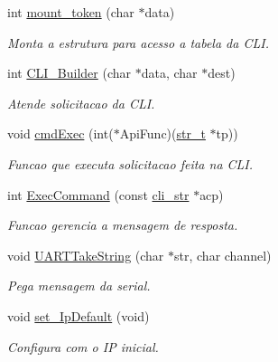 \begin{DoxyCompactItemize}
\item 
int \hyperlink{group__CLI_ga6fdb603107a7e72ff375cebbe2e98834}{mount\_\-token} (char $\ast$data)
\begin{DoxyCompactList}\small\item\em Monta a estrutura para acesso a tabela da CLI. \item\end{DoxyCompactList}\item 
int \hyperlink{group__CLI_ga51e54cd2d0893765bc23ac6d5d09d764}{CLI\_\-Builder} (char $\ast$data, char $\ast$dest)
\begin{DoxyCompactList}\small\item\em Atende solicitacao da CLI. \item\end{DoxyCompactList}\item 
void \hyperlink{group__CLI_ga5e8645941f27ac06c8c1840431b89693}{cmdExec} (int($\ast$ApiFunc)(\hyperlink{structstr__t}{str\_\-t} $\ast$tp))
\begin{DoxyCompactList}\small\item\em Funcao que executa solicitacao feita na CLI. \item\end{DoxyCompactList}\item 
int \hyperlink{group__CLI_ga8baf10611274f6c9d0470f2bb87cfde5}{ExecCommand} (const \hyperlink{structcli__str}{cli\_\-str} $\ast$acp)
\begin{DoxyCompactList}\small\item\em Funcao gerencia a mensagem de resposta. \item\end{DoxyCompactList}\item 
void \hyperlink{group__CLI_ga1429ebccb99aee0282eeff302630c26f}{UARTTakeString} (char $\ast$str, char channel)
\begin{DoxyCompactList}\small\item\em Pega mensagem da serial. \item\end{DoxyCompactList}\item 
void \hyperlink{group__CLI_ga056bc670f671c73a63bb884f8164dbb3}{set\_\-IpDefault} (void)
\begin{DoxyCompactList}\small\item\em Configura com o IP inicial. \item\end{DoxyCompactList}\item 

\end{DoxyCompactItemize}
